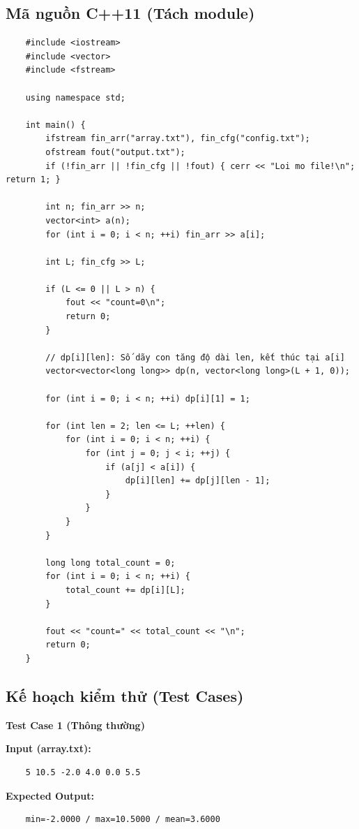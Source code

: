 \subsection{Mã nguồn C++11 (Tách module)}
    \begin{lstlisting}
    #include <iostream>
    #include <vector>
    #include <fstream>

    using namespace std;

    int main() {
        ifstream fin_arr("array.txt"), fin_cfg("config.txt");
        ofstream fout("output.txt");
        if (!fin_arr || !fin_cfg || !fout) { cerr << "Loi mo file!\n"; return 1; }

        int n; fin_arr >> n;
        vector<int> a(n);
        for (int i = 0; i < n; ++i) fin_arr >> a[i];

        int L; fin_cfg >> L;

        if (L <= 0 || L > n) {
            fout << "count=0\n";
            return 0;
        }

        // dp[i][len]: Số dãy con tăng độ dài len, kết thúc tại a[i]
        vector<vector<long long>> dp(n, vector<long long>(L + 1, 0));

        for (int i = 0; i < n; ++i) dp[i][1] = 1;

        for (int len = 2; len <= L; ++len) {
            for (int i = 0; i < n; ++i) {
                for (int j = 0; j < i; ++j) {
                    if (a[j] < a[i]) {
                        dp[i][len] += dp[j][len - 1];
                    }
                }
            }
        }

        long long total_count = 0;
        for (int i = 0; i < n; ++i) {
            total_count += dp[i][L];
        }

        fout << "count=" << total_count << "\n";
        return 0;
    }
\end{lstlisting}

\subsection{Kế hoạch kiểm thử (Test Cases)}

    \textbf{Test Case 1 (Thông thường)}

    \textbf{Input (array.txt):}
    \begin{lstlisting}
    5 10.5 -2.0 4.0 0.0 5.5\end{lstlisting}

    \textbf{Expected Output:}
    \begin{lstlisting}
    min=-2.0000 / max=10.5000 / mean=3.6000\end{lstlisting}

